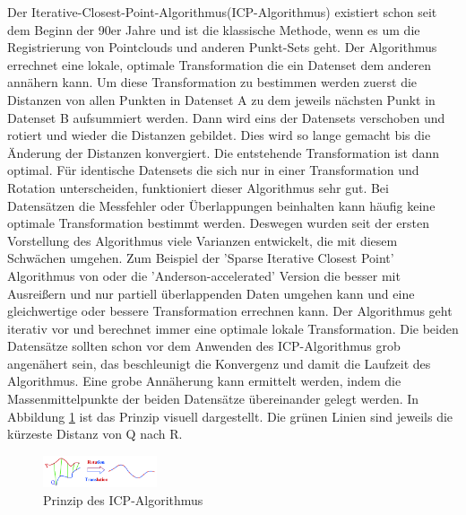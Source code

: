 Der Iterative-Closest-Point-Algorithmus(ICP-Algorithmus) existiert schon seit dem Beginn der 90er Jahre und ist 
die klassische Methode, wenn es um die Registrierung von Pointclouds und 
anderen Punkt-Sets geht. \cite{icp}
Der Algorithmus errechnet eine lokale, optimale Transformation die ein Datenset
dem anderen annähern kann. \cite{icp_og}
Um diese Transformation zu bestimmen werden zuerst die Distanzen von allen 
Punkten in Datenset A zu dem jeweils nächsten Punkt in Datenset B aufsummiert 
werden. Dann wird eins der Datensets verschoben und rotiert und wieder die 
Distanzen gebildet. Dies wird so lange gemacht bis die Änderung der Distanzen 
konvergiert. Die entstehende Transformation ist dann optimal.
Für identische Datensets die sich nur in einer Transformation und Rotation 
unterscheiden, funktioniert dieser Algorithmus sehr gut. Bei Datensätzen die 
Messfehler oder Überlappungen beinhalten kann häufig keine optimale 
Transformation bestimmt werden.
Deswegen wurden seit der ersten Vorstellung des Algorithmus viele Varianzen
entwickelt, die mit diesem Schwächen umgehen. 
Zum Beispiel der 'Sparse Iterative Closest Point' Algorithmus von \cite{Bouaziz.2013}
oder die 'Anderson-accelerated' Version die besser mit Ausreißern und nur 
partiell überlappenden Daten umgehen kann und eine gleichwertige oder bessere 
Transformation errechnen kann. \cite{icp}
Der Algorithmus geht iterativ vor und berechnet immer eine optimale lokale Transformation.
Die beiden Datensätze sollten schon vor dem Anwenden des ICP-Algorithmus grob angenähert sein, 
das beschleunigt die Konvergenz und damit die Laufzeit des Algorithmus.
Eine grobe Annäherung kann ermittelt werden, indem die Massenmittelpunkte der beiden Datensätze
übereinander gelegt werden. In Abbildung \ref{fig:ipc_princip} ist das Prinzip visuell 
dargestellt. Die grünen Linien sind jeweils die kürzeste Distanz von Q nach R. 

\begin{figure}[h]
    \centering
    \includegraphics[width=0.3\textwidth]{images/Principle-of-ICP-algorithm.png}
    \caption{Prinzip des ICP-Algorithmus}
    \label{fig:ipc_princip}
\end{figure}

